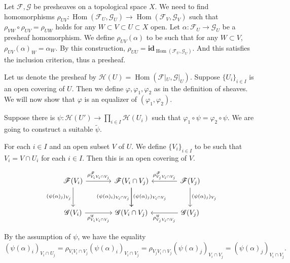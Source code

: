 \documentclass{article}
\DeclareMathOperator{\Hom}{Hom}
\begin{document}
\par Let $\mathcal{F},\mathcal{G}$ be presheaves on a topological space $X$. We need to find homomorphisms $\rho_{UV}:\Hom(\mathcal{F}_U,\mathcal{G}_U)\to\Hom(\mathcal{F}_V,\mathcal{G}_V)$ such that $\rho_{VW}\circ\rho_{UV}=\rho_{UW}$ holds
for any $W\subset V\subset U\subset X$ open. Let $\alpha:\mathcal{F}_U\to\mathcal{G}_U$ be a presheaf homomorphism. We define $\rho_{UV}(\alpha)$ to be such that for any $W\subset V$, $\rho_{UV}(\alpha)_W = \alpha_W$. By this construction, $\rho_{UU}=\mathbf{id}_{\Hom(\mathcal{F}_U,\mathcal{G}_U)}$. And this satisfies the inclusion criterion, thus a presheaf. 
\\
\par Let us denote the presheaf by $\mathcal{H}(U) = \Hom(\mathcal{F}|_U,\mathcal{G}|_U)$. Suppose $\{U_i\}_{i\in I}$ is an open covering of $U$. Then we define $\varphi,\varphi_1,\varphi_2$ as in the definition of sheaves. We will now show that $\varphi$ is an equalizer of $(\varphi_1,\varphi_2)$. \\
\par Suppose there is $\psi:\mathcal{H}(U')\to\prod_{i\in I}\mathcal{H}(U_i)$ such that $\varphi_1\circ\psi = \varphi_2\circ\psi$. We are going to construct a suitable $\tilde{\psi}$.\\

\par For each $i\in I$ and an open subset $V$ of $U$. We define $\{V_i\}_{i\in I}$ to be such that $V_i=V\cap U_i$ for each $i\in I$. Then this is an open covering of $V$. 

\[ \begin{tikzcd}[row sep=large, column sep=large]
\mathcal{F}(V_i) \arrow{r}{\rho^{\mathcal{F}}_{V_iV_i\cap V_j}} \arrow[swap]{d}{(\psi(\alpha)_j)_{V_j}} & \mathcal{F}(V_i\cap V_j) \arrow{d}[swap]{(\psi(\alpha)_i)_{V_i\cap V_j}} \arrow{d}{(\psi(\alpha)_j)_{V_i\cap V_j}}&\arrow{l}[swap]{\rho^{\mathcal{F}}_{V_jV_i\cap V_j}} \mathcal{F}(V_j)\arrow{d}{(\psi(\alpha)_j)_{V_j}}\\%
\mathcal{G}(V_i) \arrow{r}[swap]{\rho^{\mathcal{G}}_{V_iV_i\cap V_j}} & \mathcal{G}(V_i\cap V_j)&\arrow{l}{\rho^{\mathcal{G}}_{V_jV_i\cap V_j}} \mathcal{G}(V_j)
\end{tikzcd}
\]

By the assumption of $\psi$, we have the equality
\begin{equation*}
(\psi(\alpha)_i)_{V_i\cap U_j} = \rho_{V_iV_i\cap V_j}(\psi(\alpha)_i)_{V_i\cap V_j}=\rho_{V_jV_i\cap V_j}(\psi(\alpha)_j)_{V_i\cap V_j}=(\psi(\alpha)_j)_{V_i\cap V_j}.
\end{equation*}
\end{document}
